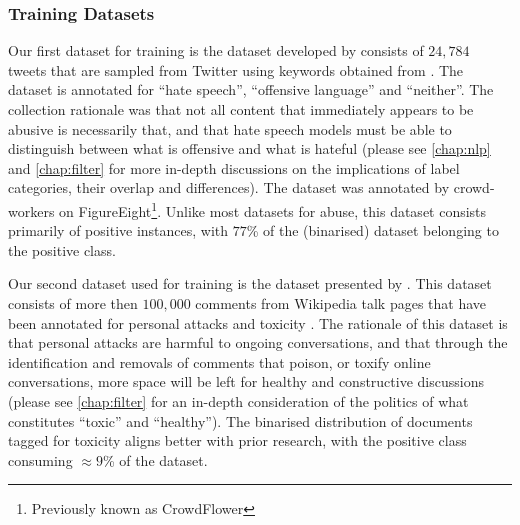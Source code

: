 
\subsubsection{Training Datasets}
Our first dataset for training is the dataset developed by \citet{Davidson:2017} consists of $24,784$ tweets that are sampled from Twitter using keywords obtained from \citet{Hatebase}. The dataset is annotated for ``hate speech'', ``offensive language'' and ``neither''. The collection rationale was that not all content that immediately appears to be abusive is necessarily that, and that hate speech models must be able to distinguish between what is offensive and what is hateful \cite{Davidson:2017} (please see \autoref{chap:nlp} and \autoref{chap:filter} for more in-depth discussions on the implications of label categories, their overlap and differences). The dataset was annotated by crowd-workers on FigureEight\footnote{Previously known as CrowdFlower}. Unlike most datasets for abuse, this dataset consists primarily of positive instances, with $77$\% of the (binarised) dataset belonging to the positive class.

Our second dataset used for training is the dataset presented by \citet{Wulczyn:2016}. This dataset consists of more then $100,000$ comments from Wikipedia talk pages that have been annotated for personal attacks and toxicity \cite{Wulczyn:2016}. The rationale of this dataset is that personal attacks are harmful to ongoing conversations, and that through the identification and removals of comments that poison, or toxify online conversations, more space will be left for healthy and constructive discussions (please see \autoref{chap:filter} for an in-depth consideration of the politics of what constitutes ``toxic'' and ``healthy''). The binarised distribution of documents tagged for toxicity aligns better with prior research, with the positive class consuming $\approx 9$\% of the dataset.

